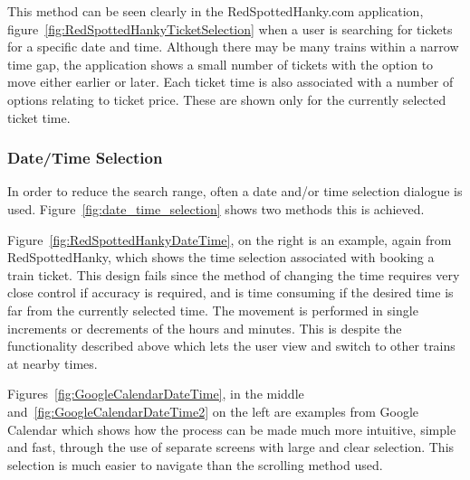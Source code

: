 This method can be seen clearly in the RedSpottedHanky.com application,
figure~\ref{fig:RedSpottedHankyTicketSelection} when a user is searching for
tickets for a specific date and time. Although there may be many trains within
a narrow time gap, the application shows a small number of tickets with the
option to move either earlier or later. Each ticket time is also associated
with a number of options relating to ticket price. These are shown only for the
currently selected ticket time.


\subsubsection{Date/Time Selection}
\label{ssub:date_time_selection}

In order to reduce the search range, often a date and/or time selection
dialogue is used. Figure~\ref{fig:date_time_selection} shows two methods this
is achieved.

Figure~\ref{fig:RedSpottedHankyDateTime}, on the right is an example, again
from RedSpottedHanky\cite{RedSpottedHanky}, which shows the time selection
associated with booking a train ticket. This design fails since the method of
changing the time requires very close control if accuracy is required, and is
time consuming if the desired time is far from the currently selected time. The
movement is performed in single increments or decrements of the hours and
minutes. This is despite the functionality described above which lets the user
view and switch to other trains at nearby times.

Figures~\ref{fig:GoogleCalendarDateTime}, in the middle
and~\ref{fig:GoogleCalendarDateTime2} on the left are examples from Google
Calendar which shows how the process can be made much more intuitive, simple
and fast, through the use of separate screens with large and clear selection.
This selection is much easier to navigate than the scrolling method used.

